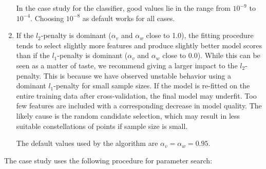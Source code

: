 \begin{enumerate}
%
In the case study for the classifier, good values lie in the range from $10^{-9}$ to $10^{-4}$.
Choosing $10^{-8}$ as default works for all cases.
%
\item If the $l_2$-penalty is dominant ($\alpha_v$ and $\alpha_w$ close to 1.0), the fitting procedure tends to select slightly more features and produce slightly better model scores than if the $l_1$-penalty is dominant ($\alpha_v$ and $\alpha_w$ close to 0.0).
While this can be seen as a matter of taste, we recommend giving a larger impact to the $l_2$-penalty.
This is because we have observed unstable behavior using a dominant $l_1$-penalty for small sample sizes.
If the model is re-fitted on the entire training data after cross-validation, the final model may underfit.
Too few features are included with a corresponding decrease in model quality.
The likely cause is the random candidate selection, which may result in less suitable constellations of points if sample size is small.\par
%
The default values used by the algorithm are $\alpha_v=\alpha_w=0.95$.
\end{enumerate}
%
The case study uses the following procedure for parameter search:
%
